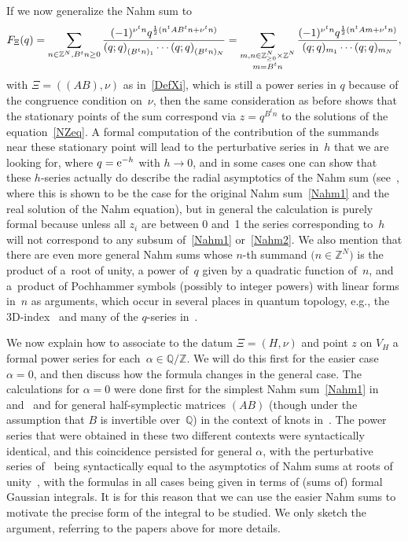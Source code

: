 \documentclass[pdftex]{sigma}
\numberwithin{equation}{section}
\def\l{\lambda}
\def\a{\alpha}
\def\l{\lambda}
\def\Z{\mathbb Z}
\def\Q{\mathbb Q}
\def\a{\alpha}
\def\l{\lambda}
\def\be{\begin{equation}}
\def\ee{\end{equation}}
\begin{document}
If we now generalize the Nahm sum to
\be
\label{Nahm2}
F_\Xi(q)=\sum_{n\in\Z^N, B^tn\ge0} \frac{(-1)^{\nu^tn} q^{\frac12(n^tAB^tn+\nu^tn)}}
{(q;q)_{\vphantom{x^\l}(B^tn)_1}\cdots(q;q)_{\vphantom{x^\l}(B^tn)_N}}
=\sum_{\substack{m,n\in\Z^N_{\ge0}\times\Z^N\\ m=B^tn}}
\frac{(-1)^{\nu^tn} q^{\frac12(n^tAm+\nu^tn)}}{(q;q)_{m_1}\cdots(q;q)_{m_N}} ,
\ee
with $\Xi=((A B),\nu)$ as in~\eqref{DefXi}, which is still a power series in $q$
because of the congruence condition on~$\nu$, then the same consideration as
before shows that the stationary points of the sum correspond via $z=q^{B^tn}$ to the
solutions of the equation~\eqref{NZeq}. A formal computation of the contribution
of the summands near these stationary point will lead to the perturbative series
in~$h$ that we are looking for, where $q={\rm e}^{-h}$ with $h\to0$, and in some cases
one can show that these $h$-series actually do describe the radial asymptotics
of the Nahm sum (see~\cite{GZ:asymptotics}, where this is shown to be the case
for the original Nahm sum~\eqref{Nahm1} and the real solution of the Nahm
equation), but in general the calculation is purely formal because unless all
$z_i$ are between 0 and~1 the series corresponding to~$h$ will not correspond
to any subsum of~\eqref{Nahm1} or~\eqref{Nahm2}. We also mention that there
are even more general Nahm sums whose $n$-th summand $\big(n\in\Z^N\big)$ is the product
of a~root of unity, a power of~$q$ given by a quadratic function of~$n$,
and a~product of Pochhammer symbols (possibly to integer powers) with linear
forms in~$n$ as arguments, which occur in several places in quantum
topology, e.g., the 3D-index~\cite{DGG} and many of the $q$-series in~\cite{GZ:qseries}.

We now explain how to associate to the datum $\Xi=(H,\nu)$ and point $z$
on $V_H$ a formal power series \smash{$\Phi_\a^{(\Xi,z)}(h)$} for each~$\a\in\Q/\Z$.
We will do this first for the easier case $\a=0$, and then discuss how the
formula changes in the general case. The calculations for $\a=0$ were done
first for the simplest Nahm sum~\eqref{Nahm1} in~\cite{Zagier} and~\cite{VZ} and
for general half-symplectic matrices $(A B)$ (though under the assumption that
$B$ is invertible over~$\Q$) in the context of knots in~\cite{DG}. The power series
that were obtained in these two different contexts were syntactically identical, and
this coincidence persisted for general $\a$, with the perturbative series of~\cite{DG2}
being syntactically equal to the asymptotics of Nahm sums at roots of
unity~\cite[Section 5]{GZ:asymptotics}, with the formulas in all cases being
given in terms of (sums of) formal Gaussian integrals. It is for this reason
that we can use the easier Nahm sums to motivate the precise form of the integral
to be studied. We only sketch the argument, referring to the papers above for more
details.
\end{document}
